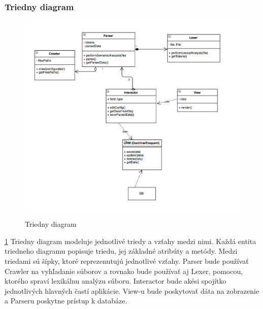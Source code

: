\documentclass[12pt,a4paper]{article}
\begin{document}
\subsubsection{Triedny diagram}
\begin{figure}[H]
	\caption{Triedny diagram}
	\includegraphics[width=\textwidth]{class_diagram}
	\label{fig:class_diagram}
\end{figure}
\ref{fig:class_diagram}
Triedny diagram modeluje jednotlivé triedy a vzťahy medzi nimi. Každá entita triedneho diagramu popisuje triedu, jej základné atribúty a metódy. Medzi triedami sú šípky, ktoré reprezenutujú jednotlivé vzťahy. Parser bude používať Crawler na vyhľadanie súborov a rovnako bude používať aj Lexer, pomocou, ktorého spraví lexikálnu analýzu súboru. Interactor bude akési spojítko jednotlivých hlavných častí aplikácie. View-u bude poskytovať dáta na zobrazenie a Parseru poskytne prístup k databáze.
\end{document}
